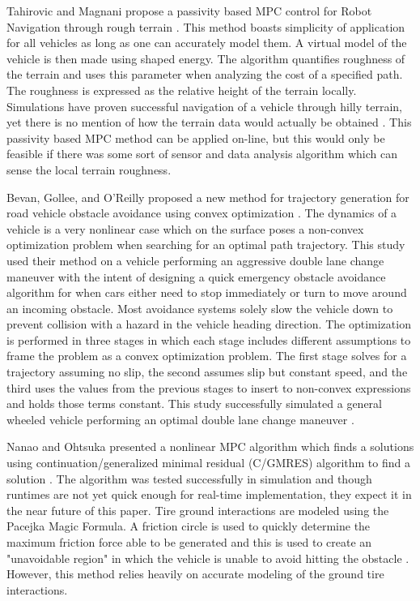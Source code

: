 \documentclass[12pt,onecolumn]{report}
\begin{document}
Tahirovic and Magnani propose a passivity based MPC control for Robot Navigation through rough terrain \cite{Tahirovic&Magnani2010}. This method boasts simplicity of application for all vehicles as long as one can accurately model them. A virtual model of the vehicle is then made using shaped energy. The algorithm quantifies roughness of the terrain and uses this parameter when analyzing the cost of a specified path. The roughness is expressed as the relative height of the terrain locally. Simulations have proven successful navigation of a vehicle through hilly terrain, yet there is no mention of how the terrain data would actually be obtained \cite{Tahirovic&Magnani2010}. This passivity based MPC method can be applied on-line, but this would only be feasible if there was some sort of sensor and data analysis algorithm which can sense the local terrain roughness.

Bevan, Gollee, and O'Reilly proposed a new method for trajectory generation for road vehicle obstacle avoidance using convex optimization \cite{Bevan&Gollee2010}. The dynamics of a vehicle is a very nonlinear case which on the surface poses a non-convex optimization problem when searching for an optimal path trajectory. This study used their method on a vehicle performing an aggressive double lane change maneuver with the intent of designing a quick emergency obstacle avoidance algorithm for when cars either need to stop immediately or turn to move around an incoming obstacle. Most avoidance systems solely slow the vehicle down to prevent collision with a hazard in the vehicle heading direction. The optimization is performed in three stages in which each stage includes different assumptions to frame the problem as a convex optimization problem. The first stage solves for a trajectory assuming no slip, the second assumes slip but constant speed, and the third uses the values from the previous stages to insert to non-convex expressions and holds those terms constant. This study successfully simulated a general wheeled vehicle performing an optimal double lane change maneuver \cite{Bevan&Gollee2010}.

Nanao and Ohtsuka presented a nonlinear MPC algorithm which finds a solutions using continuation/generalized minimal residual (C/GMRES) algorithm to find a solution \cite{Nanao&Ohtsuka2010}. The algorithm was tested successfully in simulation and though runtimes are not yet quick enough for real-time implementation, they expect it in the near future of this paper. Tire ground interactions are modeled using the Pacejka Magic Formula. A friction circle is used to quickly determine the maximum friction force able to be generated and this is used to create an "unavoidable region" in which the vehicle is unable to avoid hitting the obstacle \cite{Nanao&Ohtsuka2010}. However, this method relies heavily on accurate modeling of the ground tire interactions.
\end{document}

